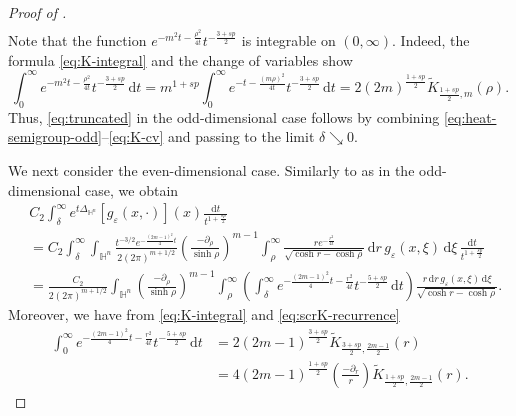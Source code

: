 \documentclass[11pt]{amsart}
\theoremstyle{plain}
\theoremstyle{definition}
\numberwithin{equation}{section}
\begin{document}
\begin{proof} [Proof of ]
\begin{equation}
\begin{split}
\end{split}
\end{equation}
Note that the function $e^{-m^{2}t-\frac{\rho^2}{4t}} t^{-\frac{3+sp}{2}}$ is integrable on $(0, \infty)$. Indeed, the formula \eqref{eq:K-integral} and the change of variables show
\begin{equation} \label{eq:K-cv}
\int_{0}^{\infty} e^{-m^{2}t-\frac{\rho^2}{4t}} t^{-\frac{3+sp}{2}} \,\mathrm{d}t = m^{1+sp} \int_{0}^{\infty} e^{-t-\frac{(m\rho)^2}{4t}} t^{-\frac{3+sp}{2}} \,\mathrm{d}t = 2(2m)^{\frac{1+sp}{2}} \widetilde{K}_{\frac{1+sp}{2},m}(\rho).
\end{equation}
Thus, \eqref{eq:truncated} in the odd-dimensional case follows by combining \eqref{eq:heat-semigroup-odd}--\eqref{eq:K-cv} and passing to the limit $\delta \searrow 0$.

We next consider the even-dimensional case. Similarly to as in the odd-dimensional case, we obtain
\begin{equation*}
\begin{split}
&C_{2} \int_{\delta}^{\infty} e^{t\Delta_{\mathbb{H}^{n}}}[g_{\varepsilon}(x,\cdot)](x) \frac{\mathrm{d}t}{t^{1+\frac{sp}{2}}} \\
&= C_{2} \int_{\delta}^{\infty} \int_{\mathbb{H}^{n}} \frac{t^{-3/2} e^{-\frac{(2m-1)^2}{4}t}}{2(2\pi)^{m+1/2}} \left( \frac{-\partial_{\rho}}{\sinh \rho} \right)^{m-1} \int_{\rho}^{\infty} \frac{r e^{-\frac{r^{2}}{4t}}}{\sqrt{\cosh r - \cosh \rho}} \,\mathrm{d}r \, g_{\varepsilon}(x,\xi) \,\mathrm{d}\xi \, \frac{\mathrm{d}t}{t^{1+\frac{sp}{2}}} \\
&= \frac{C_{2}}{2(2\pi)^{m+1/2}} \int_{\mathbb{H}^{n}} \left( \frac{-\partial_{\rho}}{\sinh \rho} \right)^{m-1} \int_{\rho}^{\infty} \left( \int_{\delta}^{\infty} e^{-\frac{(2m-1)^2}{4} t-\frac{r^2}{4t}} t^{-\frac{5+sp}{2}} \, \mathrm{d}t \right) \frac{r \,\mathrm{d}r \, g_{\varepsilon}(x, \xi) \,\mathrm{d}\xi}{\sqrt{\cosh r-\cosh \rho}}.
\end{split}
\end{equation*}
Moreover, we have from \eqref{eq:K-integral} and \eqref{eq:scrK-recurrence}
\begin{equation*}
\begin{split}
\int_{0}^{\infty} e^{-\frac{(2m-1)^2}{4} t-\frac{r^2}{4t}} t^{-\frac{5+sp}{2}} \, \mathrm{d}t
&= 2 (2m-1)^{\frac{3+sp}{2}} \widetilde{K}_{\frac{3+sp}{2}, \frac{2m-1}{2}}(r) \\
&= 4 (2m-1)^{\frac{1+sp}{2}} \left( \frac{-\partial_{r}}{r} \right) \widetilde{K}_{\frac{1+sp}{2}, \frac{2m-1}{2}}(r).

\end{split}
\end{equation*}
\end{proof}
\end{document}
